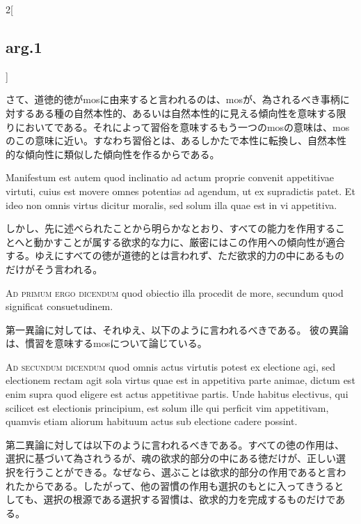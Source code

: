 \documentclass[paper=a4paper,fontsize=10pt,jafontsize=9pt,titlepage]{jlreq}
\begin{document}
\begin{paracol}{2}[\subsection{arg.1}]
\switchcolumn

さて、道徳的徳がmosに由来すると言われるのは、mosが、為されるべき事柄に
対するある種の自然本性的、あるいは自然本性的に見える傾向性を意味する限
りにおいてである。それによって習俗を意味するもう一つのmosの意味は、mos
のこの意味に近い。すなわち習俗とは、あるしかたで本性に転換し、自然本性
的な傾向性に類似した傾向性を作るからである。

\switchcolumn*

Manifestum est autem quod inclinatio ad actum proprie
convenit appetitivae virtuti, cuius est movere omnes potentias ad
agendum, ut ex supradictis patet. Et ideo non omnis virtus dicitur
moralis, sed solum illa quae est in vi appetitiva.

\switchcolumn

しかし、先に述べられたことから明らかなとおり、すべての能力を作用するこ
とへと動かすことが属する欲求的な力に、厳密にはこの作用への傾向性が適合
する。ゆえにすべての徳が道徳的とは言われず、ただ欲求的力の中にあるもの
だけがそう言われる。

\switchcolumn*[\subsection{ad.1}]

{\scshape Ad primum ergo dicendum} quod obiectio illa procedit de
more, secundum quod significat consuetudinem.

\switchcolumn

第一異論に対しては、それゆえ、以下のように言われるべきである。
彼の異論は、慣習を意味するmosについて論じている。

\switchcolumn*[\subsection{ad.2}]

{\scshape Ad secundum dicendum} quod omnis actus virtutis potest ex
electione agi, sed electionem rectam agit sola virtus quae est in
appetitiva parte animae, dictum est enim supra quod eligere est actus
appetitivae partis. Unde habitus electivus, qui scilicet est
electionis principium, est solum ille qui perficit vim appetitivam,
quamvis etiam aliorum habituum actus sub electione cadere possint.

\switchcolumn

第二異論に対しては以下のように言われるべきである。すべての徳の作用は、
選択に基づいて為されうるが、魂の欲求的部分の中にある徳だけが、正しい選
択を行うことができる。なぜなら、選ぶことは欲求的部分の作用であると言わ
れたからである。したがって、他の習慣の作用も選択のもとに入ってきうると
しても、選択の根源である選択する習慣は、欲求的力を完成するものだけであ
る。


\end{paracol}
\end{document}
